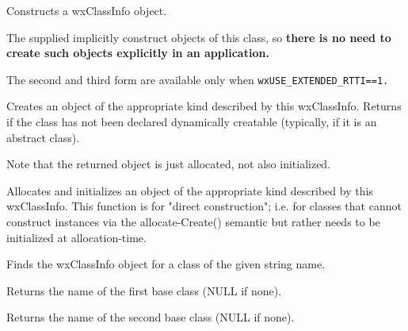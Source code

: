 Constructs a wxClassInfo object. 

The supplied  implicitly construct objects of this
class, so \bf{there is no need to create such objects explicitly in an application}.

The second and third form are available only when \tt{wxUSE_EXTENDED_RTTI==1}.



\label{wxclassinfoallocateobject}


Creates an object of the appropriate kind described by this wxClassInfo.
Returns \NULL if the class has not been declared
dynamically creatable (typically, if it is an abstract class).

Note that the returned object is just allocated, not also initialized.



\label{wxclassinfoallocateobject}


Allocates and initializes an object of the appropriate kind described by this wxClassInfo.
This function is for "direct construction"; i.e. for classes that cannot construct instances 
via the allocate-Create() semantic but rather needs to be initialized at allocation-time.


\label{wxclassinfofindclass}


Finds the wxClassInfo object for a class of the given string name.

\label{wxclassinfogetbaseclassname1}


Returns the name of the first base class (NULL if none).

\label{wxclassinfogetbaseclassname2}


Returns the name of the second base class (NULL if none).

\label{wxclassinfogetclassname}

